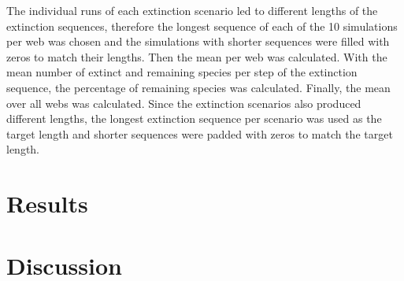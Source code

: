 \documentclass[12pt,a4paper]{article}
\begin{document}
\begin{table}[H]
\centering
\caption{\textbf{Overview of extinction models} If community variables were set to low or high contribution to determine species interactions (see \ref{sec:net_sim} for details) one model with each setting was simulated. For trophic levels either the higher or lower level was chosen and extinctions were simulated. In the 'Trophic' model either the lower or higher trophic level was chosen randomly each extinction step and a species was removed. Except for the 'Abundance' model, the species that was removed was chosen at random. For the 'Abundance' model the species with the lowest abundance was removed sequentially. Each model was run with and without rewiring.}
\label{tab:models}
\end{table}
 
 
	The individual runs of each extinction scenario led to different lengths of the extinction sequences, therefore the longest sequence of each of the 10 simulations per web was chosen and the simulations with shorter sequences were filled with zeros to match their lengths. Then the mean per web was calculated.
	With the mean number of extinct and remaining species per step of the extinction sequence, the percentage of remaining species was calculated.
	Finally, the mean over all webs was calculated. Since the extinction scenarios also produced different lengths, the longest extinction sequence per scenario was used as the target length and shorter sequences were padded with zeros to match the target length.
\section{Results}

\newpage
	\section{Discussion}
\end{document}
